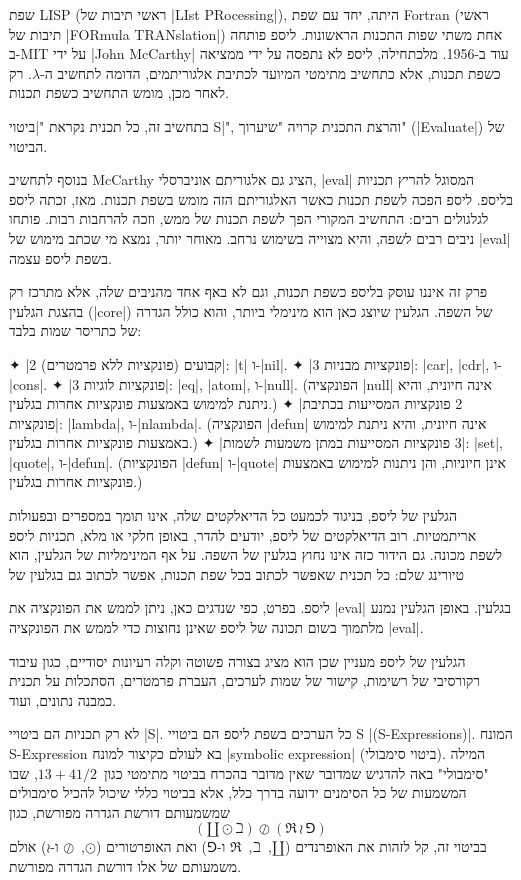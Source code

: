 שפת LISP (ראשי תיבות של \E|LIst PRocessing|), היתה, יחד עם שפת Fortran (ראשי
תיבות של \E|FORmula TRANslation|) אחת משתי שפות התכנות הראשונות. ליספ פותחה
ב-MIT על ידי \E|John McCarthy| עוד ב-1956. מלכתחילה, ליספ לא נתפסה על ידי
ממציאה כשפת תכנות, אלא כתחשיב מתימטי המיועד לכתיבת אלגוריתמים, הדומה לתחשיב
ה-$λ$. רק לאחר מכן, מומש התחשיב כשפת תכנות.

בתחשיב זה, כל תכנית נקראת "\ע|ביטוי S|", והרצת התכנית קרויה "שיערוך"
(\E|Evaluate|) של הביטוי.

בנוסף לתחשיב McCarthy הציג גם אלגוריתם אוניברסלי, \E|eval| המסוגל להריץ תכניות
בליספ. ליספ הפכה לשפת תכנות כאשר האלגוריתם הזה מומש בשפת תכנות. מאז, זכתה
ליספ לגלגולים רבים: התחשיב המקורי הפך לשפת תכנות של ממש, וזכה להרחבות רבות.
פותחו ניבים רבים לשפה, והיא מצוייה בשימוש נרחב. מאוחר יותר, נמצא מי שכתב מימוש
של \E|eval| בשפת ליספ עצמה.

פרק זה איננו עוסק בליספ כשפת תכנות, וגם לא באף אחד מהניבים שלה, אלא מתרכז רק
בהצגת הגלעין (\E|core|) של השפה. הגלעין שיוצג כאן הוא מינימלי ביותר,
והוא כולל הגדרה של כתריסר שמות בלבד:
\begin{itemize}
  ✦ \ע|2 קבועים (פונקציות ללא פרמטרים)|: \E|t| ו-\E|nil|.
  ✦ \ע|3 פונקציות מבניות|: \E|car|, \E|cdr|, ו-\E|cons|.
  ✦ \ע|3 פונקציות לוגיות|: \E|eq|, \E|atom|, ו-\E|null|.
  (הפונקציה \E|null| אינה חיונית, והיא ניתנת למימוש באמצעות פונקציות אחרות
  בגלעין.)
  ✦ \ע|2 פונקציות המסייעות בכתיבת פונקציות|:
  \E|lambda|, ו-\E|nlambda|.
  (הפונקציה \E|defun| אינה חיונית, והיא ניתנת למימוש באמצעות פונקציות אחרות
  בגלעין.)
  ✦ \ע|3 פונקציות המסייעות במתן משמעות לשמות|:
  \E|set|, \E|quote|, ו-\E|defun|.
(הפונקציות \E|defun| ו-\E|quote| אינן חיוניות, והן ניתנות למימוש באמצעות
פונקציות אחרות בגלעין.)
\end{itemize}

הגלעין של ליספ, בניגוד לכמעט כל הדיאלקטים שלה, אינו תומך במספרים ובפעולות
אריתמטיות. רוב הדיאלקטים של ליספ, יודעים להדר, באופן חלקי או מלא, תכניות ליספ
לשפת מכונה. גם הידור כזה אינו נחוץ בגלעין של השפה. על אף המינימליות של הגלעין,
הוא טיורינג שלם: כל תכנית שאפשר לכתוב בכל שפת תכנות, אפשר לכתוב גם בגלעין של

ליספ. בפרט, כפי שנדגים כאן, ניתן לממש את הפונקציה את \E|eval| בגלעין. באופן
הגלעין נמנע מלתמוך בשום תכונה של ליספ שאינן נחוצות כדי לממש את
הפונקציה \E|eval|.

הגלעין של ליספ מעניין שכן הוא מציג בצורה פשוטה וקלה רעיונות יסודיים, כגון עיבוד
רקורסיבי של רשימות, קישור של שמות לערכים, העברת פרמטרים, הסתכלות על תכנית כמבנה
נתונים, ועוד.

לא רק תכניות הם ביטויי \E|S|. כל הערכים בשפת ליספ הם ביטויי S
\E|(S-Expressions)|. המונח S-Expression בא לעולם כקיצור למונח \E|symbolic
expression| (ביטוי
סימבולי). המילה "סימבולי" באה להדגיש שמדובר שאין מדובר בהכרח בביטוי מתימטי
כגון~$13+41/2$, שבו המשמעות של כל הסימנים ידועה בדרך כלל, אלא בביטוי כללי
שיכול להכיל סימבולים שמשמעותם דורשת הגדרה מפורשת, כגון
\begin{equation*}
  (\amalg ⊙ ℶ) ⊘ (\Re ≀ \Game)
\end{equation*}
בביטוי זה, קל לזהות את האופרנדים
($\amalg$,~$ℶ$,~$\Re$ ו-$\Game$)
ואת האופרטורים
($⊙$,~$⊘$ ו-$≀$)
אולם משמעותם של אלו דורשת הגדרה מפורשת.

